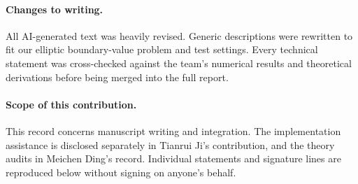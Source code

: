 \paragraph{Changes to writing.}
All AI-generated text was heavily revised. Generic descriptions were rewritten to fit our elliptic boundary-value problem and test settings. Every technical statement was cross-checked against the team’s numerical results and theoretical derivations before being merged into the full report.


\paragraph{Scope of this contribution.}
This record concerns manuscript writing and integration. The implementation
assistance is disclosed separately in Tianrui Ji's contribution, and the
theory audits in Meichen Ding's record. Individual statements and signature
lines are reproduced below without signing on anyone's behalf.
